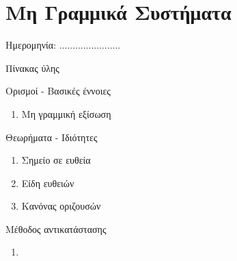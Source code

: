 \documentclass[twoside,nofonts,internet,math,spyros]{frontisthrio}
\newcommand{\myitem}{\stepcounter{enumi}\item[\raisebox{0.5mm}{\faExclamationTriangle}\ \Large$\square$]}
\begin{document}
\section{Μη Γραμμικά Συστήματα}
\begin{flushright}
\faCalendar* Ημερομηνία: .......................
\end{flushright}
\begin{mybox}[mysubtitle]{Πίνακας ύλης}
\begin{tcbraster}[raster columns=2,raster equal height]
\begin{myleftbox}{Ορισμοί - Βασικές έννοιες\ \ \faBook}
\begin{enumerate}[itemsep=0mm]
\item Μη γραμμική εξίσωση
\end{enumerate}
\end{myleftbox}
\begin{myrightbox}{Θεωρήματα - Ιδιότητες\ \ \faTools}
\begin{enumerate}[itemsep=0mm]
\item Σημείο σε ευθεία
\item Είδη ευθειών
\item Κανόνας οριζουσών
\end{enumerate}
\end{myrightbox}
\end{tcbraster}
\begin{multicols}{2}
\begin{todolist}[itemsep=0mm]
\myitem Μέθοδος αντικατάστασης
\end{todolist}
\end{multicols}
\begin{multicols}{2}
\begin{enumerate}[itemsep=0mm]
\item 
\end{enumerate}
\end{multicols}
\end{mybox}
\newpage
\end{document}
